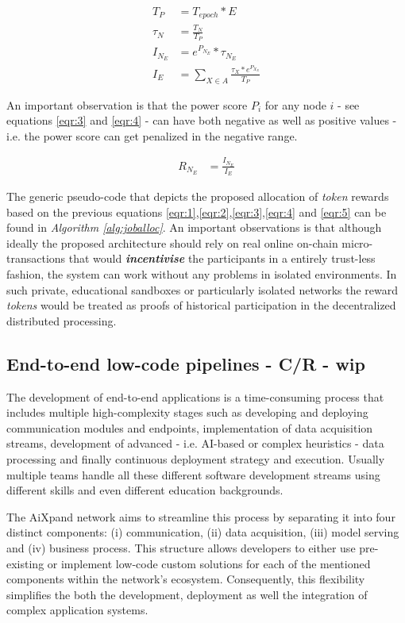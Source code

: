 \documentclass{article}
\begin{document}
\begin{align}
T_P &= T_{epoch} * E\label{eqr:1}\\
\tau_{N} &= \frac {T_{N}}{T_P}\label{eqr:2}\\
I_{N_E} &= e^{P_{N_E}} * \tau_{N_{E}}\label{eqr:3}\\
I_{E} &=\sum_{X \in A}{\frac {\tau_{X} * e^{P_{X_E}}}{T_P}}\label{eqr:4}
\end{align}

An important observation is that the power score $P_i$ for any node $i$ - see equations \ref{eqr:3} and \ref{eqr:4} - can have both negative as well as positive values - i.e. the power score can get penalized in the negative range.

\begin{align}
R_{N_E} &= \frac{I_{N_E}}{I_{E}} \label{eqr:5}
\end{align}

The generic pseudo-code that depicts the proposed allocation of \textit{token} rewards based on the previous equations \ref{eqr:1},\ref{eqr:2},\ref{eqr:3},\ref{eqr:4} and \ref{eqr:5} can be found in \textit{Algorithm \ref{alg:joballoc}}. An important observations is that although ideally the proposed architecture should rely on real online on-chain micro-transactions that would \textit{\textbf{incentivise}} the participants in a entirely trust-less fashion, the system can work without any problems in isolated environments. In such private, educational sandboxes or particularly isolated networks the reward \textit{tokens} would be treated as proofs of historical participation in the decentralized distributed processing.

\subsection{End-to-end low-code pipelines - C/R - wip}
The development of end-to-end applications is a time-consuming process that includes multiple high-complexity stages such as developing and deploying communication modules and endpoints, implementation of data acquisition streams,  development of advanced - i.e. AI-based or complex heuristics - data processing and finally continuous deployment strategy and execution. Usually multiple teams handle all these different software development streams using different skills and even different education backgrounds. 

The AiXpand network aims to streamline this process by separating it into four distinct components: (i) communication, (ii) data acquisition, (iii) model serving and (iv) business process. This structure allows developers to either use pre-existing or implement low-code custom solutions for each of the mentioned components within the network's ecosystem. Consequently, this flexibility simplifies the both the development, deployment as well the integration of complex application systems.
\end{document}
